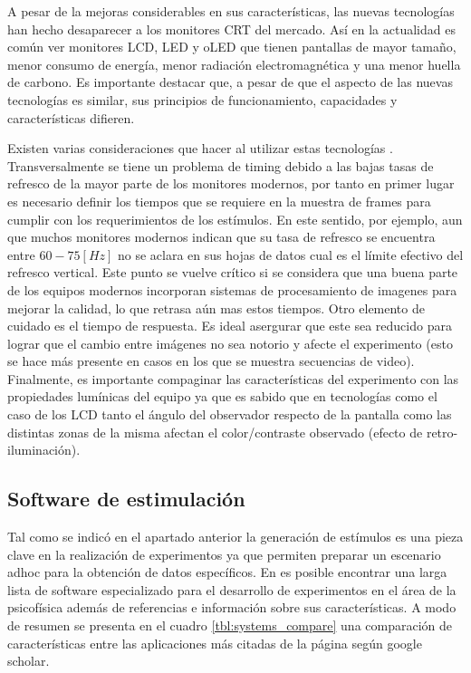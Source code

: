 \documentclass[../main.tex]{subfiles}
\begin{document}
		A pesar de la mejoras considerables en sus características, las nuevas tecnologías han hecho desaparecer a los monitores CRT del mercado. Así en la actualidad es común ver monitores LCD, LED y oLED que tienen pantallas de mayor tamaño, menor consumo de energía, menor radiación electromagnética y una menor huella de carbono. Es importante destacar que, a pesar de que el aspecto de las nuevas tecnologías es similar, sus principios de funcionamiento, capacidades y características difieren.

		Existen varias consideraciones que hacer al utilizar estas tecnologías \cite{article:monitor_wang, article:monitor_elze}. Transversalmente se tiene un problema de timing debido a las bajas tasas de refresco de la mayor parte de los monitores modernos, por tanto en primer lugar es necesario definir los tiempos que se requiere en la muestra de frames para cumplir con los requerimientos de los estímulos. En este sentido, por ejemplo, aun que muchos monitores modernos indican que su tasa de refresco se encuentra entre $60-75[Hz]$ no se aclara en sus hojas de datos cual es el límite efectivo del refresco vertical. Este punto se vuelve crítico si se considera que una buena parte de los equipos modernos incorporan sistemas de procesamiento de imagenes para mejorar la calidad, lo que retrasa aún mas estos tiempos. Otro elemento de cuidado es el tiempo de respuesta. Es ideal asergurar que este sea reducido para lograr que el cambio entre imágenes no sea notorio y afecte el experimento (esto se hace más presente en casos en los que se muestra secuencias de video). Finalmente, es importante compaginar las características del experimento con las propiedades lumínicas del equipo ya que es sabido que en tecnologías como el caso de los LCD tanto el ángulo del observador respecto de la pantalla como las distintas zonas de la misma afectan el color/contraste observado (efecto de retro-iluminación). 
			
		\subsection{Software de estimulación}
		\label{sub:02_software_de_estimulacion}

			Tal como se indicó en el apartado anterior la generación de estímulos es una pieza clave en la realización de experimentos ya que permiten preparar un escenario adhoc para la obtención de datos específicos. En \cite{website:software} es posible encontrar una larga lista de software especializado para el desarrollo de experimentos en el área de la psicofísica además de referencias e información sobre sus características. A modo de resumen se presenta en el cuadro \ref{tbl:systems_compare} una comparación de características entre las aplicaciones más citadas de la página según google scholar.  
\end{document}
